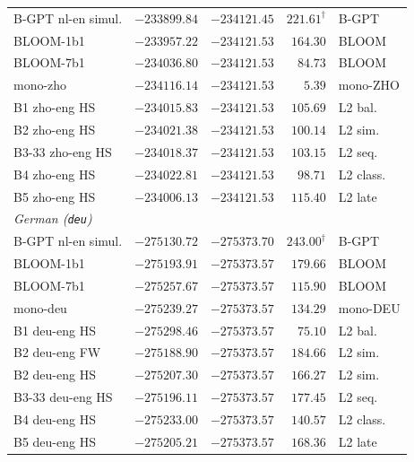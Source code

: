 \begin{table}[!ht]
\begin{tabular}{lrrrl}
    \midrule
    B-GPT nl-en simul. & $-233899.84$ & $-234121.45$ & $221.61^{\dagger}$ & B-GPT \\
    BLOOM-1b1 & $-233957.22$ & $-234121.53$ & $164.30$ & BLOOM \\
    BLOOM-7b1 & $-234036.80$ & $-234121.53$ & $84.73$ & BLOOM \\
    mono-zho & $-234116.14$ & $-234121.53$ & $5.39$ & mono-ZHO \\
    B1 zho-eng HS & $-234015.83$ & $-234121.53$ & $105.69$ & L2 bal. \\
    B2 zho-eng HS & $-234021.38$ & $-234121.53$ & $100.14$ & L2 sim. \\
    B3-33 zho-eng HS & $-234018.37$ & $-234121.53$ & $103.15$ & L2 seq. \\
    B4 zho-eng HS & $-234022.81$ & $-234121.53$ & $98.71$ & L2 class. \\
    B5 zho-eng HS & $-234006.13$ & $-234121.53$ & $115.40$ & L2 late \\
    \midrule
    \multicolumn{5}{l}{\textit{German (\texttt{deu})}} \\
    \midrule
    B-GPT nl-en simul. & $-275130.72$ & $-275373.70$ & $243.00^{\dagger}$ & B-GPT \\
    BLOOM-1b1 & $-275193.91$ & $-275373.57$ & $179.66$ & BLOOM \\
    BLOOM-7b1 & $-275257.67$ & $-275373.57$ & $115.90$ & BLOOM \\
    mono-deu & $-275239.27$ & $-275373.57$ & $134.29$ & mono-DEU \\
    B1 deu-eng HS & $-275298.46$ & $-275373.57$ & $75.10$ & L2 bal. \\
    B2 deu-eng FW & $-275188.90$ & $-275373.57$ & $184.66$ & L2 sim. \\
    B2 deu-eng HS & $-275207.30$ & $-275373.57$ & $166.27$ & L2 sim. \\
    B3-33 deu-eng HS & $-275196.11$ & $-275373.57$ & $177.45$ & L2 seq. \\
    B4 deu-eng HS & $-275233.00$ & $-275373.57$ & $140.57$ & L2 class. \\
    B5 deu-eng HS & $-275205.21$ & $-275373.57$ & $168.36$ & L2 late \\
    \bottomrule
  \end{tabular}
\end{table}
 
